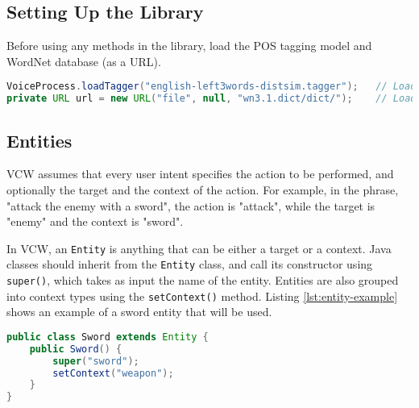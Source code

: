 \documentclass{article}
\begin{document}
\subsection{Setting Up the Library}
\label{section:setting}
Before using any methods in the library, load the POS tagging model and WordNet database (as a URL).


\begin{lstlisting}[language=Java, label=lst:setup]
VoiceProcess.loadTagger("english-left3words-distsim.tagger");	// Load POS tagging model
private URL url = new URL("file", null, "wn3.1.dict/dict/");	// Load WordNet database
\end{lstlisting}

\subsection{Entities}

VCW assumes that every user intent specifies the action to be performed, and optionally the target and the context of the action. For example, in the phrase, "attack the enemy with a sword", the action is "attack", while the target is "enemy" and the context is "sword".

In VCW, an \texttt{Entity} is anything that can be either a target or a context. Java classes should inherit from the \texttt{Entity} class, and call its constructor using \texttt{super()}, which takes as input the name of the entity. Entities are also grouped into context types using the \texttt{setContext()} method. Listing \ref{lst:entity-example} shows an example of a sword entity that will be used.


\begin{lstlisting}[language=Java, caption=Example of a Sword Entity, label={lst:entity-example}]
public class Sword extends Entity {
    public Sword() {
        super("sword");
        setContext("weapon");
    }
}
\end{lstlisting}
\end{document}
